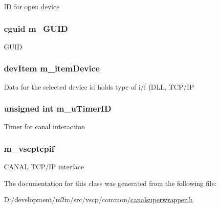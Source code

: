 \label{d5/d59/class_c_canal_super_wrapper_a6f16be93eed366b6e545ccf469972f29}
ID for open device \hypertarget{class_c_canal_super_wrapper_a74162ac667cb8ce2f851fe90917d1d60}{
\subsubsection[{m\_\-GUID}]{\setlength{\rightskip}{0pt plus 5cm}cguid {\bf m\_\-GUID}}}
\label{d5/d59/class_c_canal_super_wrapper_a74162ac667cb8ce2f851fe90917d1d60}
GUID \hypertarget{class_c_canal_super_wrapper_a93e40611475c114e967b598efb1cf237}{
\subsubsection[{m\_\-itemDevice}]{\setlength{\rightskip}{0pt plus 5cm}devItem {\bf m\_\-itemDevice}}}
\label{d5/d59/class_c_canal_super_wrapper_a93e40611475c114e967b598efb1cf237}
Data for the selected device id holds type of i/f (DLL, TCP/IP \hypertarget{class_c_canal_super_wrapper_a448eaae6cdc17ac73a2fdde17b196c41}{
\subsubsection[{m\_\-uTimerID}]{\setlength{\rightskip}{0pt plus 5cm}unsigned int {\bf m\_\-uTimerID}}}
\label{d5/d59/class_c_canal_super_wrapper_a448eaae6cdc17ac73a2fdde17b196c41}
Timer for canal interaction \hypertarget{class_c_canal_super_wrapper_a424c1402464eb1cc2a94605a76cede4d}{
\subsubsection[{m\_\-vscptcpif}]{ {\bf m\_\-vscptcpif}}}
\label{d5/d59/class_c_canal_super_wrapper_a424c1402464eb1cc2a94605a76cede4d}
CANAL TCP/IP interface 

The documentation for this class was generated from the following file:\begin{DoxyCompactItemize}
\item 
D:/development/m2m/src/vscp/common/\hyperlink{canalsuperwrapper_8h}{canalsuperwrapper.h}\end{DoxyCompactItemize}
